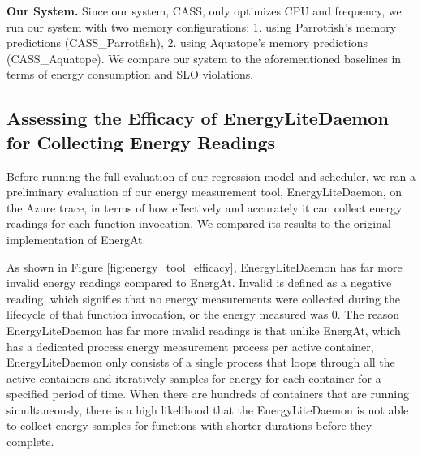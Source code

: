 \documentclass[times, 10pt,twocolumn]{article}
\begin{document}
\textbf{Our System.} Since our system, CASS, only optimizes CPU and frequency, we run our system with two memory configurations: 1. using Parrotfish's memory predictions (CASS\_Parrotfish), 2. using Aquatope's memory predictions (CASS\_Aquatope). We compare our system to the aforementioned baselines in terms of energy consumption and SLO violations.

\subsection{Assessing the Efficacy of EnergyLiteDaemon for Collecting Energy Readings}

Before running the full evaluation of our regression model and scheduler, we ran a preliminary evaluation of our energy measurement tool, EnergyLiteDaemon, on the Azure trace, in terms of how effectively and accurately it can collect energy readings for each function invocation. We compared its results to the original implementation of EnergAt.  

As shown in Figure \ref{fig:energy_tool_efficacy}, EnergyLiteDaemon has far more invalid energy readings compared to EnergAt. Invalid is defined as a negative reading, which signifies that no energy measurements were collected during the lifecycle of that function invocation, or the energy measured was 0. The reason EnergyLiteDaemon has far more invalid readings is that unlike EnergAt, which has a dedicated process energy measurement process per active container, EnergyLiteDaemon only consists of a single process that loops through all the active containers and iteratively samples for energy for each container for a specified period of time. When there are hundreds of containers that are running simultaneously, there is a high likelihood that the EnergyLiteDaemon is not able to collect energy samples for functions with shorter durations before they complete. 
\end{document}
